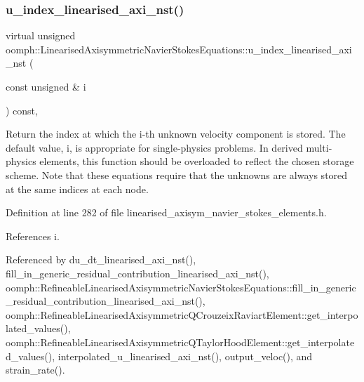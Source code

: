 \subsubsection{\texorpdfstring{u\+\_\+index\+\_\+linearised\+\_\+axi\+\_\+nst()}{u\_index\_linearised\_axi\_nst()}}
{\footnotesize\ttfamily virtual unsigned oomph\+::\+Linearised\+Axisymmetric\+Navier\+Stokes\+Equations\+::u\+\_\+index\+\_\+linearised\+\_\+axi\+\_\+nst (\begin{DoxyParamCaption}\item[{const unsigned \&}]{i }\end{DoxyParamCaption}) const\hspace{0.3cm}{\ttfamily [inline]}, {\ttfamily [virtual]}}



Return the index at which the i-\/th unknown velocity component is stored. The default value, i, is appropriate for single-\/physics problems. In derived multi-\/physics elements, this function should be overloaded to reflect the chosen storage scheme. Note that these equations require that the unknowns are always stored at the same indices at each node. 



Definition at line 282 of file linearised\+\_\+axisym\+\_\+navier\+\_\+stokes\+\_\+elements.\+h.



References i.



Referenced by du\+\_\+dt\+\_\+linearised\+\_\+axi\+\_\+nst(), fill\+\_\+in\+\_\+generic\+\_\+residual\+\_\+contribution\+\_\+linearised\+\_\+axi\+\_\+nst(), oomph\+::\+Refineable\+Linearised\+Axisymmetric\+Navier\+Stokes\+Equations\+::fill\+\_\+in\+\_\+generic\+\_\+residual\+\_\+contribution\+\_\+linearised\+\_\+axi\+\_\+nst(), oomph\+::\+Refineable\+Linearised\+Axisymmetric\+Q\+Crouzeix\+Raviart\+Element\+::get\+\_\+interpolated\+\_\+values(), oomph\+::\+Refineable\+Linearised\+Axisymmetric\+Q\+Taylor\+Hood\+Element\+::get\+\_\+interpolated\+\_\+values(), interpolated\+\_\+u\+\_\+linearised\+\_\+axi\+\_\+nst(), output\+\_\+veloc(), and strain\+\_\+rate().

\mbox{\label{classoomph_1_1LinearisedAxisymmetricNavierStokesEquations_a385f3354d6afc7f455c4f1a31d7ec64b}} 
